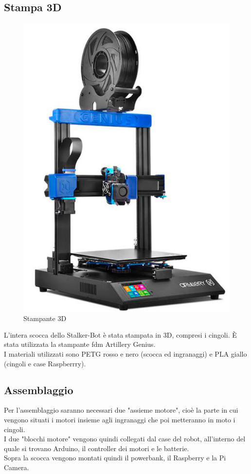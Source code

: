 \documentclass[12pt]{report}
\begin{document}
\subsection{Stampa 3D}
\begin{figure}
\centering
\vspace{-50pt}
\includegraphics[width=0.9\linewidth]{images/components/stampante.png} 
\caption{Stampante 3D}
\vspace{+50pt}
\end{figure}
L'intera scocca dello Stalker-Bot è stata stampata in 3D, compresi i cingoli. È stata utilizzata la stampante fdm Artillery Genius.\\
I materiali utilizzati sono PETG rosso e nero (scocca ed ingranaggi) e PLA giallo (cingoli e case Raspberrry).

\subsection{Assemblaggio}
Per l'assemblaggio saranno necessari due "assieme motore", cioè la parte in cui vengono situati i motori insieme agli ingranaggi che poi metteranno in moto i cingoli.\\
I due "blocchi motore" vengono quindi collegati dal case del robot, all'interno del quale si trovano Arduino, il controller dei motori e le batterie.\\
Sopra la scocca vengono montati quindi il powerbank, il Raspberry e la Pi Camera.
\end{document}
